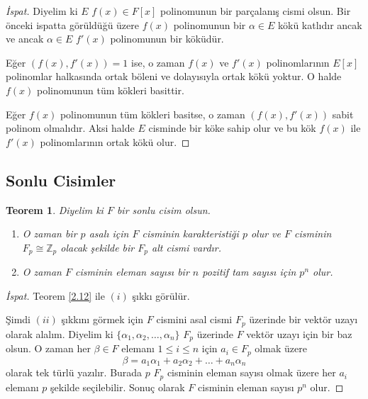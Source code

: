 \documentclass{article}
\newtheorem{thm}{Teorem}[section]
\theoremstyle{definition}
\theoremstyle{remark}
\begin{document}
    	    \begin{proof}[İspat]
    	        Diyelim ki $E$ $f(x) \in F[x]$ polinomunun bir parçalanış cismi olsun. Bir önceki ispatta görüldüğü üzere $f(x)$ polinomunun bir $\alpha \in E$ kökü katlıdır ancak ve ancak $\alpha \in E$ $f'(x)$ polinomunun bir köküdür.\par
    	        Eğer $(f(x), f'(x)) = 1$ ise, o zaman $f(x)$ ve $f'(x)$ polinomlarının $E[x]$ polinomlar halkasında ortak böleni ve dolayısıyla ortak kökü yoktur. O halde $f(x)$ polinomunun tüm kökleri basittir.\par
    	        Eğer $f(x)$ polinomunun tüm kökleri basitse, o zaman $(f(x), f'(x))$ sabit polinom olmalıdır. Aksi halde $E$ cisminde bir köke sahip olur ve bu kök $f(x)$ ile $f'(x)$ polinomlarının ortak kökü olur.
    	    \end{proof}
	        
    	\subsection{Sonlu Cisimler}
    	
    	    \begin{thm}\label{4.6}
    	        Diyelim ki $F$ bir sonlu cisim olsun.
    	        \begin{enumerate}
				\renewcommand{\labelenumi}{(\roman{enumi})}
				    \item O zaman bir $p$ asalı için $F$ cisminin karakteristiği $p$ olur ve $F$ cisminin $F_p \cong \mathbb{Z}_p$ olacak şekilde bir $F_p$ alt cismi vardır.
				    \item O zaman $F$ cisminin eleman sayısı bir $n$ pozitif tam sayısı için $p^n$ olur.
				\end{enumerate}
    	    \end{thm}
    	    
    	    \begin{proof}[İspat]
    	        Teorem \ref{2.12} ile $(i)$ şıkkı görülür.\par
    	        Şimdi $(ii)$ şıkkını görmek için $F$ cismini asal cismi $F_p$ üzerinde bir vektör uzayı olarak alalım. Diyelim ki $\{\alpha_1, \alpha_2, \dots, \alpha_n\}$ $F_p$ üzerinde $F$ vektör uzayı için bir baz olsun. O zaman her $\beta \in F$ elemanı $1 \leq i \leq n$ için $a_i \in F_p$ olmak üzere
    	        \begin{equation*}
    	            \beta = a_1\alpha_1 + a_2\alpha_2 + \dots + a_n\alpha_n
    	        \end{equation*}
    	        olarak tek türlü yazılır. Burada $p$ $F_p$ cisminin eleman sayısı olmak üzere her $a_i$ elemanı $p$ şekilde seçilebilir. Sonuç olarak $F$ cisminin eleman sayısı $p^n$ olur.
    	    \end{proof}
    	    
\end{document}
